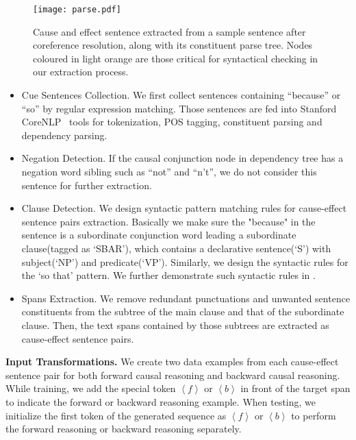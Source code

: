 \begin{figure}[t!]
	\centering
	\texttt{[image: parse.pdf]}
	\caption{Cause and effect sentence extracted from a sample sentence after coreference resolution, along with its constituent parse tree. Nodes coloured in light orange are those critical for syntactical checking in our extraction process.}
	\label{fig:parse}
\end{figure}
\begin{itemize}
	\item Cue Sentences Collection. 
	We first collect sentences containing ``because'' or ``so'' by regular expression matching. Those sentences are fed into Stanford CoreNLP~\cite{stanfordcorenlp} tools for tokenization, POS tagging, constituent parsing and dependency parsing.
	\item Negation Detection. 
	If the causal conjunction node in dependency tree
	has a negation word sibling such as ``not'' and ``n't'', 
	we do not consider this sentence for further extraction.
	\item Clause Detection. 
	We design syntactic pattern matching rules for 
	cause-effect sentence pairs extraction.
	 Basically we make sure the "because" in the sentence is a subordinate conjunction word leading a subordinate clause(tagged as `SBAR'), which contains a declarative 
	sentence(`S') with subject(`NP') and predicate(`VP').
	Similarly, we design the syntactic rules for the `so that' pattern.
	We further demonstrate such syntactic rules in .
	
	\item Spans Extraction. 
	We remove redundant punctuations and unwanted sentence
	constituents from the subtree of the main clause and that of the subordinate clause. Then, the text spans contained by those subtrees are extracted as cause-effect sentence pairs.

\end{itemize}

\textbf{Input Transformations.} 
We create two data examples from each cause-effect sentence pair for both forward causal reasoning and backward causal reasoning.
While training, we add the special token $\left< f\right>$ or $\left< b \right>$ in front of the target span to indicate the forward or backward reasoning example.
When testing, we initialize the first token of the generated sequence as $\left< f\right>$ or $\left< b \right>$  to perform the forward reasoning or backward reasoning separately.

